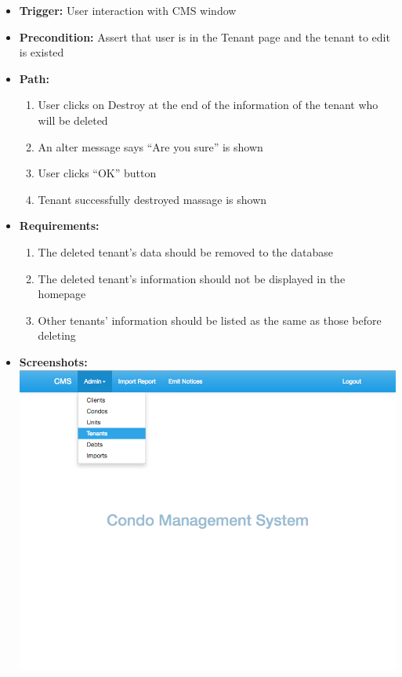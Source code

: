 \begin{itemize}
  \item[] \textbf{Trigger:} User interaction with CMS window
  \item[] \textbf{Precondition:} Assert that user is in the Tenant page and the tenant to edit is existed
  \item[] \textbf{Path:}
    \begin{enumerate}
      \item User clicks on Destroy at the end of the information of the tenant who will be deleted
      \item An alter message says ``Are you sure'' is shown
      \item User clicks ``OK'' button
      \item Tenant successfully destroyed massage is shown
    \end{enumerate}
  \item[] \textbf{Requirements:}
    \begin{enumerate}
      \item The deleted tenant’s data should be removed to the database
      \item The deleted tenant’s information should not be displayed in the homepage
      \item Other tenants’ information should be listed as the same as those before deleting
    \end{enumerate}
  \item[] \textbf{Screenshots:}\\
    \includegraphics[scale=0.25]{./images/ss/tenant/delete/1.png}

\end{itemize}
